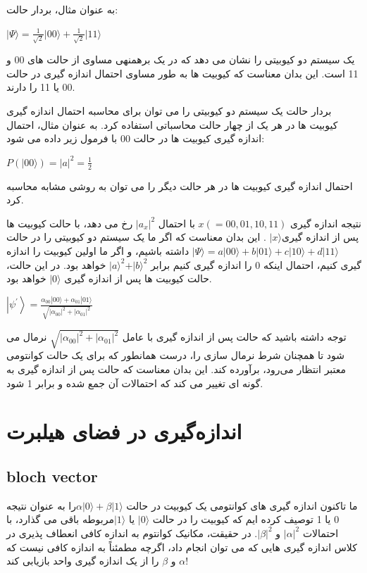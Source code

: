 \documentclass{book}
\begin{document}
به عنوان مثال، بردار حالت:

\begin{center}
$\vert \Psi \rangle = \frac{1}{\sqrt{2}} \vert00\rangle + \frac{1}{\sqrt{2}} \vert11\rangle$	
\end{center}

یک سیستم دو کیوبیتی را نشان می دهد که در یک برهمنهی مساوی از حالت های 00 و 11 است. این بدان معناست که کیوبیت ها به طور مساوی احتمال اندازه گیری در حالت 00 یا 11 را دارند.

بردار حالت یک سیستم دو کیوبیتی را می توان برای محاسبه احتمال اندازه گیری کیوبیت ها در هر یک از چهار حالت محاسباتی استفاده کرد. به عنوان مثال، احتمال اندازه گیری کیوبیت ها در حالت 00 با فرمول زیر داده می شود:
\begin{center}
$P(\vert00\rangle) = \vert a\vert^ 2 = \frac{1}{2}$
\end{center}


احتمال اندازه گیری کیوبیت ها در هر حالت دیگر را می توان به روشی مشابه محاسبه کرد.

نتیجه اندازه گیری $x (= 00, 01, 10 , 11)$ با احتمال $\vert a_{x} \vert ^ 2$ رخ می دهد، با حالت کیوبیت ها پس از اندازه گیری$\vert x \rangle$ . این بدان معناست که اگر ما یک سیستم دو کیوبیتی را در حالت
$\vert \Psi \rangle = a \vert00\rangle + b \vert01\rangle + c \vert10\rangle + d \vert11\rangle $ داشته باشیم، و اگر ما اولین کیوبیت را اندازه گیری کنیم، احتمال اینکه 0 را اندازه گیری کنیم برابر $\vert a \rangle^2 + \vert b \rangle ^ 2$ خواهد بود. در این حالت، حالت کیوبیت ها پس از اندازه گیری $\vert 0 \rangle$ خواهد بود.




\begin{center}
	$\left|\psi^{\prime}\right\rangle=\frac{\alpha_{00}|00\rangle+\alpha_{01}|01\rangle}{\sqrt{\left|\alpha_{00}\right|^2+\left|\alpha_{01}\right|^2}}$
\end{center}
توجه داشته باشید که حالت پس از اندازه گیری با عامل $\sqrt{|{α}_{00}|^2 + |{α}_{01}|^2}$ نرمال می شود
تا همچنان شرط نرمال سازی را، درست همانطور که برای یک
حالت کوانتومی معتبر انتظار می‌‌رود، برآورده کند. این بدان معناست که حالت پس از اندازه گیری به گونه ای تغییر می کند که احتمالات آن جمع شده و برابر 1 شود.

\section{اندازه‌گیری در فضای هیلبرت}
\subsection{bloch vector}
ما تاکنون اندازه گیری های کوانتومی یک کیوبیت در حالت $\alpha\vert0\rangle + \beta\vert1\rangle$را به عنوان نتیجه 0 یا 1 توصیف کرده ایم که کیوبیت را در حالت $\vert 0 \rangle$ یا $\vert 1 \rangle$مربوطه باقی می گذارد، با احتمالات $\vert\alpha\vert ^ 2$ و $\vert\beta\vert ^ 2$. در حقیقت، مکانیک کوانتوم به اندازه کافی انعطاف پذیری در کلاس اندازه گیری هایی که می توان انجام داد، اگرچه مطمئناً به اندازه کافی نیست که $\alpha$ و $\beta$ را از یک اندازه گیری واحد بازیابی کند!
\end{document}
